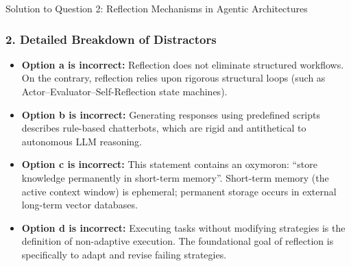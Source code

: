 \documentclass[11pt,a4paper]{article}
\begin{document}
\begin{solutionbox}{Solution to Question 2: Reflection Mechanisms in Agentic Architectures}
\subsubsection*{2. Detailed Breakdown of Distractors}
\begin{itemize}[leftmargin=1.5em]
    \item \textbf{Option a is incorrect:} Reflection does not eliminate structured workflows. On the contrary, reflection relies upon rigorous structural loops (such as Actor--Evaluator--Self-Reflection state machines).
    \item \textbf{Option b is incorrect:} Generating responses using predefined scripts describes rule-based chatterbots, which are rigid and antithetical to autonomous LLM reasoning.
    \item \textbf{Option c is incorrect:} This statement contains an oxymoron: ``store knowledge permanently in short-term memory''. Short-term memory (the active context window) is ephemeral; permanent storage occurs in external long-term vector databases.
    \item \textbf{Option d is incorrect:} Executing tasks without modifying strategies is the definition of non-adaptive execution. The foundational goal of reflection is specifically to adapt and revise failing strategies.
\end{itemize}
\end{solutionbox}
\end{document}
